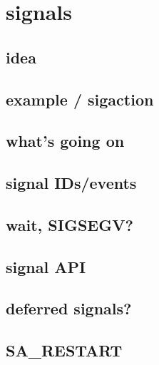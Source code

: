 \section{signals}

\subsection{idea}



\subsection{example / sigaction}



\subsection{what's going on}




\subsection{signal IDs/events}




\subsection{wait, SIGSEGV?}



\subsection{signal API}



\subsection{deferred signals?}


\subsection{SA\_RESTART}


